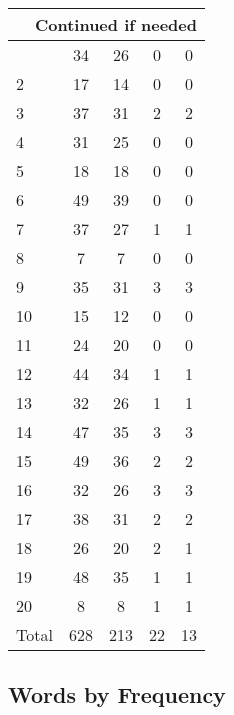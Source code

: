 \begin{center}
\begin{longtable}{l|c|c|c|c}
\hline \multicolumn{5}{|r|}{{Continued if needed}} \\ \hline
\endfoot 
1 & 34 & 26 & 0 & 0\\ \hline
2 & 17 & 14 & 0 & 0\\ \hline
3 & 37 & 31 & 2 & 2\\ \hline
4 & 31 & 25 & 0 & 0\\ \hline
5 & 18 & 18 & 0 & 0\\ \hline
6 & 49 & 39 & 0 & 0\\ \hline
7 & 37 & 27 & 1 & 1\\ \hline
8 & 7 & 7 & 0 & 0\\ \hline
9 & 35 & 31 & 3 & 3\\ \hline
10 & 15 & 12 & 0 & 0\\ \hline
11 & 24 & 20 & 0 & 0\\ \hline
12 & 44 & 34 & 1 & 1\\ \hline
13 & 32 & 26 & 1 & 1\\ \hline
14 & 47 & 35 & 3 & 3\\ \hline
15 & 49 & 36 & 2 & 2\\ \hline
16 & 32 & 26 & 3 & 3\\ \hline
17 & 38 & 31 & 2 & 2\\ \hline
18 & 26 & 20 & 2 & 1\\ \hline
19 & 48 & 35 & 1 & 1\\ \hline
20 & 8 & 8 & 1 & 1\\ \hline
\hline \hline
Total & 628 & 213 & 22 & 13



\end{longtable}
\end{center}

 
\subsection{Words by Frequency}


